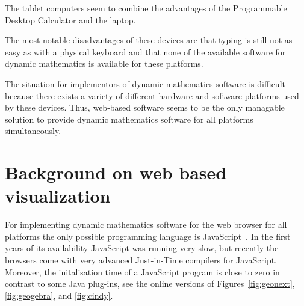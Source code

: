 \documentclass[12pt,a4paper]{article}%
\begin{document}
The tablet computers seem to combine the advantages of the Programmable Desktop Calculator 
and the laptop. 

The most notable disadvantages of these devices are that typing is still not as easy 
as with a physical keyboard and that none of the available software for 
dynamic mathematics is available for these platforms.

The situation for implementors of dynamic mathematics software is difficult because there exists a variety
of different hardware and software platforms used by these devices. Thus, 
web-based software seems to be the only managable solution to provide 
dynamic mathematics software for all platforms simultaneously.

\section{Background on web based visualization}\label{sec:3}
For implementing dynamic mathematics software for the web browser for all platforms 
the only possible programming language is JavaScript~\cite{crockford}. In the first years of its availability
JavaScript was running very slow, but recently the browsers come with very advanced
Just-in-Time compilers for JavaScript. Moreover, the initalisation time of a 
JavaScript program is close to zero in contrast to some Java plug-ins, see the online versions of
Figures~\ref{fig:geonext}, \ref{fig:geogebra}, and \ref{fig:cindy}.
\end{document}
